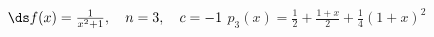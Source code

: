{$\ds f(x) = \frac{1}{x^2+1}, \quad n=3, \quad c=-1$
}
{$p_3(x) =\frac{1}{2}+\frac{1+x}{2}+\frac{1}{4} (1+x)^2$
}